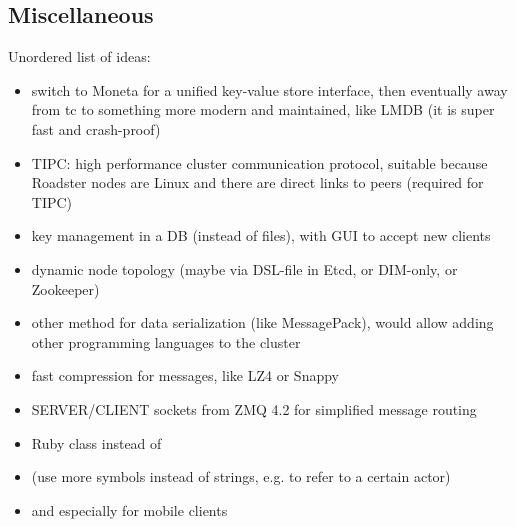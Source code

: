 \subsection{Miscellaneous}
Unordered list of ideas:
\begin{itemize}
	\item switch to Moneta for a unified key-value store interface, then eventually away from \gls{tc} to something more modern and maintained, like LMDB (it is super fast and crash-proof)
	\item TIPC: high performance cluster communication protocol, suitable because Roadster nodes are Linux and there are direct links to peers (required for TIPC)
	\item key management in a DB (instead of files), with GUI to accept new clients
	\item dynamic node topology (maybe via DSL-file in Etcd, or DIM-only, or Zookeeper)
	\item other method for data serialization (like MessagePack), would allow adding other programming languages to the cluster
	\item fast compression for messages, like LZ4 or Snappy
	\item SERVER/CLIENT sockets from ZMQ 4.2 for simplified message routing
	\item Ruby  class instead of 
	\item (use more symbols instead of strings, e.g. to refer to a certain actor)
	\item {} and  especially for mobile clients
\end{itemize}

